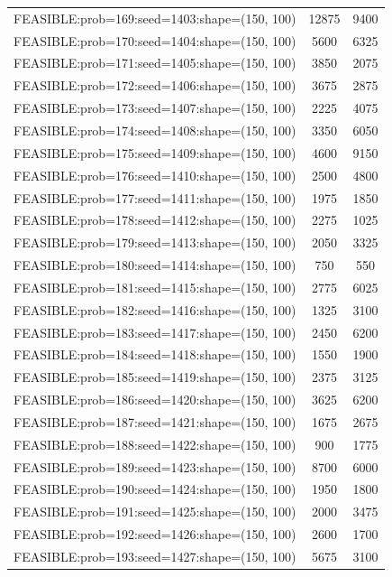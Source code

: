 \begin{longtable}{lcc}
FEASIBLE:prob=169:seed=1403:shape=(150, 100) &    12875 &  9400 \\
FEASIBLE:prob=170:seed=1404:shape=(150, 100) &     5600 &  6325 \\
FEASIBLE:prob=171:seed=1405:shape=(150, 100) &     3850 &  2075 \\
FEASIBLE:prob=172:seed=1406:shape=(150, 100) &     3675 &  2875 \\
FEASIBLE:prob=173:seed=1407:shape=(150, 100) &     2225 &  4075 \\
FEASIBLE:prob=174:seed=1408:shape=(150, 100) &     3350 &  6050 \\
FEASIBLE:prob=175:seed=1409:shape=(150, 100) &     4600 &  9150 \\
FEASIBLE:prob=176:seed=1410:shape=(150, 100) &     2500 &  4800 \\
FEASIBLE:prob=177:seed=1411:shape=(150, 100) &     1975 &  1850 \\
FEASIBLE:prob=178:seed=1412:shape=(150, 100) &     2275 &  1025 \\
FEASIBLE:prob=179:seed=1413:shape=(150, 100) &     2050 &  3325 \\
FEASIBLE:prob=180:seed=1414:shape=(150, 100) &      750 &   550 \\
FEASIBLE:prob=181:seed=1415:shape=(150, 100) &     2775 &  6025 \\
FEASIBLE:prob=182:seed=1416:shape=(150, 100) &     1325 &  3100 \\
FEASIBLE:prob=183:seed=1417:shape=(150, 100) &     2450 &  6200 \\
FEASIBLE:prob=184:seed=1418:shape=(150, 100) &     1550 &  1900 \\
FEASIBLE:prob=185:seed=1419:shape=(150, 100) &     2375 &  3125 \\
FEASIBLE:prob=186:seed=1420:shape=(150, 100) &     3625 &  6200 \\
FEASIBLE:prob=187:seed=1421:shape=(150, 100) &     1675 &  2675 \\
FEASIBLE:prob=188:seed=1422:shape=(150, 100) &      900 &  1775 \\
FEASIBLE:prob=189:seed=1423:shape=(150, 100) &     8700 &  6000 \\
FEASIBLE:prob=190:seed=1424:shape=(150, 100) &     1950 &  1800 \\
FEASIBLE:prob=191:seed=1425:shape=(150, 100) &     2000 &  3475 \\
FEASIBLE:prob=192:seed=1426:shape=(150, 100) &     2600 &  1700 \\
FEASIBLE:prob=193:seed=1427:shape=(150, 100) &     5675 &  3100 \\

\end{longtable}
